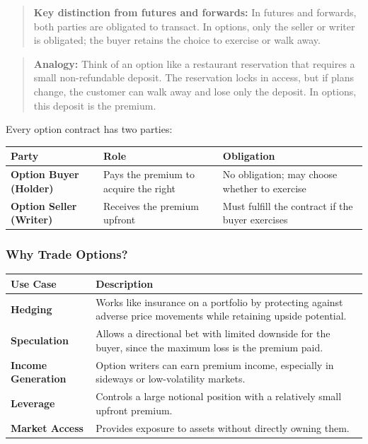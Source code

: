 \documentclass[12pt,openany]{book}
\begin{document}
\begin{quote}
\textbf{Key distinction from futures and forwards:} In futures and forwards, both parties are obligated to transact. In options, only the seller or writer is obligated; the buyer retains the choice to exercise or walk away.
\end{quote}

\begin{quote}
\textbf{Analogy:} Think of an option like a restaurant reservation that requires a small non-refundable deposit. The reservation locks in access, but if plans change, the customer can walk away and lose only the deposit. In options, this deposit is the premium.
\end{quote}

Every option contract has two parties:

\begin{center}
\small
\begin{tabular}{|L{4cm}|L{5.2cm}|L{5.2cm}|}
\hline
\textbf{Party} & \textbf{Role} & \textbf{Obligation} \\
\hline
\textbf{Option Buyer (Holder)} & Pays the premium to acquire the right & No obligation; may choose whether to exercise \\
\hline
\textbf{Option Seller (Writer)} & Receives the premium upfront & Must fulfill the contract if the buyer exercises \\
\hline
\end{tabular}
\end{center}

\subsubsection{Why Trade Options?}

\begin{center}
\small
\begin{tabular}{|L{3.2cm}|L{10.8cm}|}
\hline
\textbf{Use Case} & \textbf{Description} \\
\hline
\textbf{Hedging} & Works like insurance on a portfolio by protecting against adverse price movements while retaining upside potential. \\
\hline
\textbf{Speculation} & Allows a directional bet with limited downside for the buyer, since the maximum loss is the premium paid. \\
\hline
\textbf{Income Generation} & Option writers can earn premium income, especially in sideways or low-volatility markets. \\
\hline
\textbf{Leverage} & Controls a large notional position with a relatively small upfront premium. \\
\hline
\textbf{Market Access} & Provides exposure to assets without directly owning them. \\
\hline
\end{tabular}
\end{center}
\end{document}
